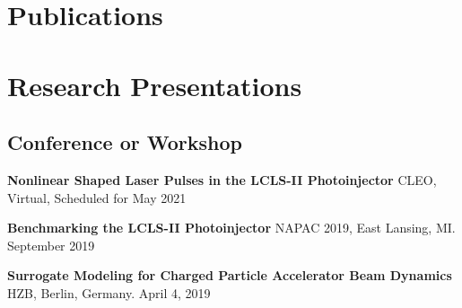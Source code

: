 \documentclass[11pt,a4paper,sans]{moderncv}        %
\begin{document}
\newpage

\section{Publications}

\vspace{0.5em}

\vspace{0.5em}

\vspace{0.5em}


\vspace{0.5em}
%

\section{Research Presentations}
\subsection{Conference or Workshop} %
\textbf{Nonlinear Shaped Laser Pulses in the LCLS-II Photoinjector }\newline
CLEO, Virtual, Scheduled for May 2021
\vspace{0.3em}

\textbf{Benchmarking the LCLS-II Photoinjector}\newline
NAPAC 2019, East Lansing, MI. September 2019
\vspace{0.3em}

\textbf{Surrogate Modeling for Charged Particle Accelerator Beam Dynamics}\newline
HZB, Berlin, Germany. April 4, 2019
\vspace{0.3em}
\end{document}
